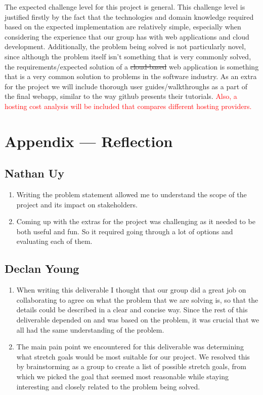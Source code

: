 \documentclass{article}
\begin{document}
The expected challenge level for this project is general. This challenge level is justified firstly by the fact that the technologies and domain knowledge required based on the expected implementation are relatively simple, especially when considering the experience that our group has with web applications and cloud development. Additionally, the problem being solved is not particularly novel, since although the problem itself isn’t something that is very commonly solved, the requirements/expected solution of a \sout{cloud-based} web application is something that is a very common solution to problems in the software industry. \newline \newline
As an extra for the project we will include thorough user guides/walkthroughs as a part of the final webapp, similar to the way github presents their tutorials. \textcolor{red}{Also, a hosting cost analysis will be included that compares different hosting providers.}


\newpage{}

\section*{Appendix --- Reflection}

\subsection*{Nathan Uy}

\begin{enumerate}
    \item Writing the problem statement allowed me to understand the scope of the project and its impact on stakeholders.
    \item Coming up with the extras for the project was challenging as it needed to be both useful and fun. So it required going through a lot of options and evaluating each of them.
\end{enumerate}  

\subsection*{Declan Young}

\begin{enumerate}
    \item When writing this deliverable I thought that our group did a great job on collaborating to agree on what the problem that we are solving is, so that the details could be described in a clear and concise way. Since the rest of this deliverable depended on and was based on the problem, it was crucial that we all had the same understanding of the problem.
    \item The main pain point we encountered for this deliverable was determining what stretch goals would be most suitable for our project. We resolved this by brainstorming as a group to create a list of possible stretch goals, from which we picked the goal that seemed most reasonable while staying interesting and closely related to the problem being solved.
\end{enumerate}  
\end{document}
